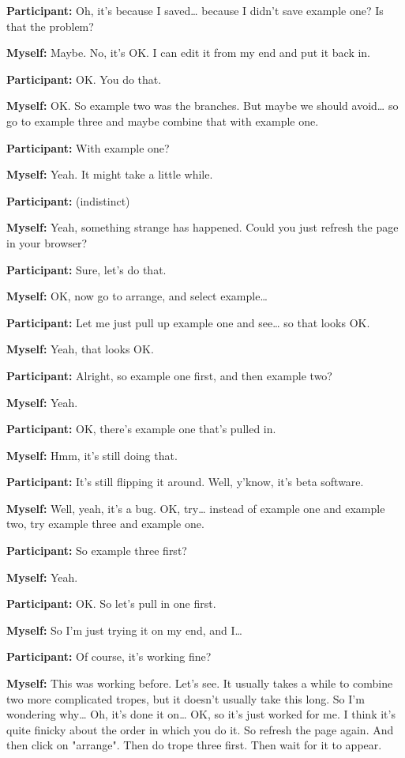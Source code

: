 \documentclass[11pt]{report}
\begin{document}
\begin{linenumbers}
\textbf{Participant:} Oh, it's because I saved\ldots{} because I didn't save example one? Is that the problem?

\textbf{Myself:} Maybe. No, it's OK. I can edit it from my end and put it back in.

\textbf{Participant:} OK. You do that.

\textbf{Myself:} OK. So example two was the branches. But maybe we should avoid\ldots{} so go to example three and maybe combine that with example one.

\textbf{Participant:} With example one?

\textbf{Myself:} Yeah. It might take a little while.

\textbf{Participant:} (indistinct)

\textbf{Myself:} Yeah, something strange has happened. Could you just refresh the page in your browser?

\textbf{Participant:} Sure, let's do that.

\textbf{Myself:} OK, now go to arrange, and select example\ldots{}

\textbf{Participant:} Let me just pull up example one and see\ldots{} so that looks OK.

\textbf{Myself:} Yeah, that looks OK.

\textbf{Participant:} Alright, so example one first, and then example two?

\textbf{Myself:} Yeah.

\textbf{Participant:} OK, there's example one that's pulled in.

\textbf{Myself:} Hmm, it's still doing that.

\textbf{Participant:} It's still flipping it around. Well, y'know, it's beta software.

\textbf{Myself:} Well, yeah, it's a bug. OK, try\ldots{} instead of example one and example two, try example three and example one.

\textbf{Participant:} So example three first?

\textbf{Myself:} Yeah.

\textbf{Participant:} OK. So let's pull in one first.

\textbf{Myself:} So I'm just trying it on my end, and I\ldots{}

\textbf{Participant:} Of course, it's working fine?

\textbf{Myself:} This was working before. Let's see. It usually takes a while to combine two more complicated tropes, but it doesn't usually take this long. So I'm wondering why\ldots{} Oh, it's done it on\ldots{} OK, so it's just worked for me. I think it's quite finicky about the order in which you do it. So refresh the page again. And then click on "arrange". Then do trope three first. Then wait for it to appear.


\end{linenumbers}
\end{document}
